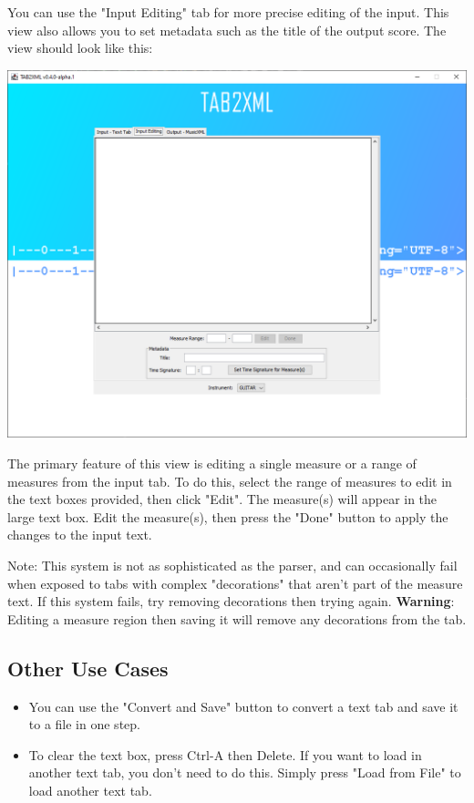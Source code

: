 \documentclass[11pt]{article}
\begin{document}
You can use the "Input Editing" tab for more precise editing of the input.  This view also allows you to set metadata such as the title of the output score.  The view should look like this:
\begin{center}
\includegraphics[width=.9\linewidth]{../Screenshots/input-editing-tabbedview-0.4.0.png}
\end{center}
The primary feature of this view is editing a single measure or a range of measures from the input tab.  To do this, select the range of measures to edit in the text boxes provided, then click "Edit".  The measure(s) will appear in the large text box.  Edit the measure(s), then press the "Done" button to apply the changes to the input text.

Note: This system is not as sophisticated as the parser, and can occasionally fail when exposed to tabs with complex "decorations" that aren't part of the measure text.  If this system fails, try removing decorations then trying again.
\textbf{Warning}: Editing a measure region then saving it will remove any decorations from the tab.
\subsection{Other Use Cases}
\label{sec:org16b4a41}
\begin{itemize}
\item You can use the "Convert and Save" button to convert a text tab and save it to a file in one step.
\item To clear the text box, press Ctrl-A then Delete.  If you want to load in another text tab, you don't need to do this.  Simply press "Load from File" to load another text tab.
\end{itemize}
\end{document}
